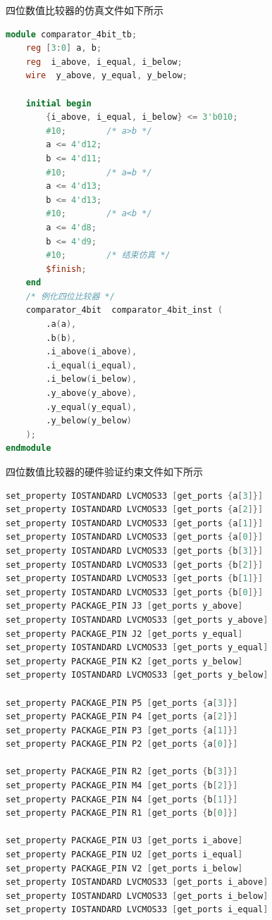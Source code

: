 \documentclass{article}
\begin{document}
四位数值比较器的仿真文件如下所示\\
\begin{lstlisting}[language=Verilog, caption={四位数值比较器仿真文件}]
module comparator_4bit_tb;
    reg [3:0] a, b;
    reg  i_above, i_equal, i_below;
    wire  y_above, y_equal, y_below;

    initial begin
        {i_above, i_equal, i_below} <= 3'b010;
        #10;        /* a>b */
        a <= 4'd12;
        b <= 4'd11;
        #10;        /* a=b */
        a <= 4'd13;
        b <= 4'd13;
        #10;        /* a<b */
        a <= 4'd8;
        b <= 4'd9;
        #10;        /* 结束仿真 */
        $finish;
    end
    /* 例化四位比较器 */
    comparator_4bit  comparator_4bit_inst (
        .a(a),
        .b(b),
        .i_above(i_above),
        .i_equal(i_equal),
        .i_below(i_below),
        .y_above(y_above),
        .y_equal(y_equal),
        .y_below(y_below)
    );
endmodule
\end{lstlisting}
四位数值比较器的硬件验证约束文件如下所示\\
\begin{lstlisting}[language=Verilog, caption={四位数值比较器的硬件验证约束文件}]
set_property IOSTANDARD LVCMOS33 [get_ports {a[3]}]
set_property IOSTANDARD LVCMOS33 [get_ports {a[2]}]
set_property IOSTANDARD LVCMOS33 [get_ports {a[1]}]
set_property IOSTANDARD LVCMOS33 [get_ports {a[0]}]
set_property IOSTANDARD LVCMOS33 [get_ports {b[3]}]
set_property IOSTANDARD LVCMOS33 [get_ports {b[2]}]
set_property IOSTANDARD LVCMOS33 [get_ports {b[1]}]
set_property IOSTANDARD LVCMOS33 [get_ports {b[0]}]
set_property PACKAGE_PIN J3 [get_ports y_above]
set_property IOSTANDARD LVCMOS33 [get_ports y_above]
set_property PACKAGE_PIN J2 [get_ports y_equal]
set_property IOSTANDARD LVCMOS33 [get_ports y_equal]
set_property PACKAGE_PIN K2 [get_ports y_below]
set_property IOSTANDARD LVCMOS33 [get_ports y_below]

set_property PACKAGE_PIN P5 [get_ports {a[3]}]
set_property PACKAGE_PIN P4 [get_ports {a[2]}]
set_property PACKAGE_PIN P3 [get_ports {a[1]}]
set_property PACKAGE_PIN P2 [get_ports {a[0]}]

set_property PACKAGE_PIN R2 [get_ports {b[3]}]
set_property PACKAGE_PIN M4 [get_ports {b[2]}]
set_property PACKAGE_PIN N4 [get_ports {b[1]}]
set_property PACKAGE_PIN R1 [get_ports {b[0]}]

set_property PACKAGE_PIN U3 [get_ports i_above]
set_property PACKAGE_PIN U2 [get_ports i_equal]
set_property PACKAGE_PIN V2 [get_ports i_below]
set_property IOSTANDARD LVCMOS33 [get_ports i_above]
set_property IOSTANDARD LVCMOS33 [get_ports i_below]
set_property IOSTANDARD LVCMOS33 [get_ports i_equal]
\end{lstlisting}
\end{document}
